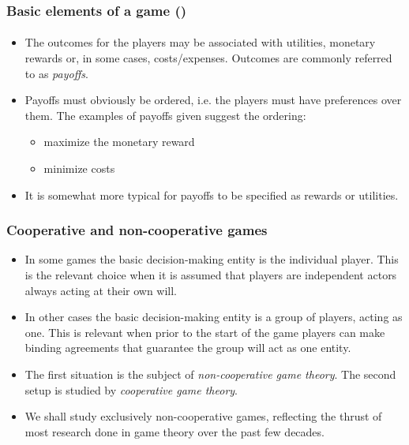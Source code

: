 \documentclass[10pt]{beamer}
\theoremstyle{definition}
\begin{document}
\begin{frame}[fragile]
\frametitle{Basic elements of a game ()}
\framesubtitle{}
\begin{itemize}\itemsep1em
\item The outcomes for the players may be associated with utilities, monetary rewards or, in some cases, costs/expenses. Outcomes are commonly referred to as \emph{payoffs}.
\item Payoffs must obviously be ordered, i.e. the players must have preferences over them. The examples of payoffs given suggest the ordering: 
	\begin{itemize}\itemsep1em
	\item maximize the monetary reward
	\item minimize costs
	\end{itemize}
\item It is somewhat more typical for payoffs to be specified as rewards or utilities. 
\end{itemize}
\end{frame}



\begin{frame}[fragile]
\frametitle{Cooperative and non-cooperative games}
\begin{itemize}\itemsep1em
\item In some games the basic decision-making entity is the individual player. This is the relevant choice when it is assumed that players are independent actors always acting at their own will.
\item In other cases the basic decision-making entity is a group of players, acting as one. This is relevant when prior to the start of the game players can make binding agreements that guarantee the group will act as one entity.
\item The first situation is the subject of \emph{non-cooperative game theory}. The second setup is studied by \emph{cooperative game theory}.
\item We shall study exclusively non-cooperative games, reflecting the thrust of most research done in game theory over the past few decades.
\end{itemize}
\end{frame}
\end{document}
